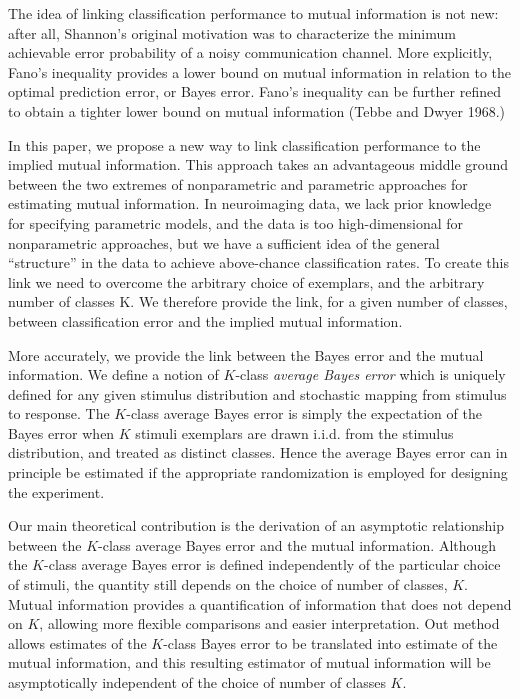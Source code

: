 \documentclass[12pt]{article}
\begin{document}
The idea of linking classification performance to mutual information
is not new: after all, Shannon's original motivation was to
characterize the minimum achievable error probability of a noisy
communication channel.  More explicitly, Fano's inequality provides a
lower bound on mutual information in relation to the optimal
prediction error, or Bayes error.  Fano's inequality can be further
refined to obtain a tighter lower bound on mutual information (Tebbe
and Dwyer 1968.)

In this paper, we propose a new way to link classification performance
to the implied mutual information. This approach takes an advantageous
middle ground between the two extremes of nonparametric and parametric
approaches for estimating mutual information. In neuroimaging data, we
lack prior knowledge for specifying parametric models, and the data is
too high-dimensional for nonparametric approaches, but we have a
sufficient idea of the general ``structure'' in the data to achieve
above-chance classification rates. To create this link we need to
overcome the arbitrary choice of exemplars, and the arbitrary number
of classes K. We therefore provide the link, for a given number of
classes, between classification error and the implied mutual
information.

More accurately, we provide the link between the Bayes error and the
mutual information. We define a notion of $K$-class \emph{average
Bayes error} which is uniquely defined for any given stimulus
distribution and stochastic mapping from stimulus to response.  The
$K$-class average Bayes error is simply the expectation of the Bayes
error when $K$ stimuli exemplars are drawn i.i.d. from the stimulus
distribution, and treated as distinct classes.  Hence the average
Bayes error can in principle be estimated if the appropriate
randomization is employed for designing the experiment.

Our main theoretical contribution is the derivation of an asymptotic
relationship between the $K$-class average Bayes error and the mutual
information. Although the $K$-class average Bayes error is defined
independently of the particular choice of stimuli, the quantity still
depends on the choice of number of classes, $K$. Mutual information
provides a quantification of information that does not depend on $K$,
allowing more flexible comparisons and easier interpretation. Out
method allows estimates of the $K$-class Bayes error to be translated
into estimate of the mutual information, and this resulting estimator
of mutual information will be asymptotically independent of the choice
of number of classes $K$.
\end{document}
